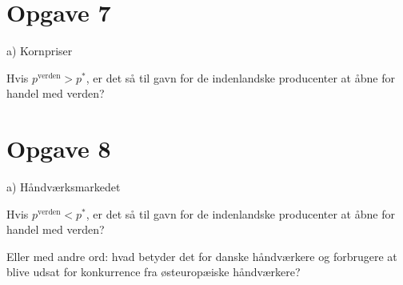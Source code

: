 \section{Opgave 7}

\begin{frame}{a) Kornpriser}

Hvis $p^{\textrm{verden}}>p^*$, er det så til gavn for de indenlandske producenter at åbne for handel med verden?


\end{frame}

\section{Opgave 8}


\begin{frame}{a) Håndværksmarkedet}

Hvis $p^{\textrm{verden}}<p^*$, er det så til gavn for de indenlandske producenter at åbne for handel med verden?

Eller med andre ord: hvad betyder det for danske håndværkere og forbrugere at blive udsat for konkurrence fra østeuropæiske håndværkere?

\end{frame}
